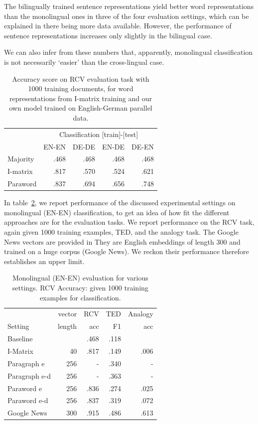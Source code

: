 The bilingually trained sentence representations yield better word representations than the monolingual ones in three of the four evaluation settings, which can be explained in there being more data available. However, the performance of sentence representations increases only slightly in the bilingual case.

We can also infer from these numbers that, apparently, monolingual classification is not necessarily `easier' than the cross-lingual case.





\begin{table}[ht]
\center
\setlength\tabcolsep{2pt}
\begin{tabular}{l | r r r r}
		& \multicolumn{4}{c}{Classification [train]-[test]}	\\
		&EN-EN	&DE-DE	&EN-DE	&DE-EN	\\\hline
Majority	&.468		&.468		&.468		&.468		\\
I-matrix	&.817		&.570		&.524		&.621		\\
Paraword  	&.837		&.694		&.656		&.748		\\
\end{tabular}
\caption{Accuracy score on RCV evaluation task with 1000 training documents, for word representations from I-matrix training and our own model trained on English-German parallel data.}
\label{t:dbow_bi_klemen}
\end{table}

In table~\ref{t:monoEval}, we report performance of the discussed experimental settings on monolingual (EN-EN) classification, to get an idea of how fit the different approaches are for the evaluation tasks. We report performance on the RCV task, again given 1000 training examples, TED, and the analogy task. The Google News vectors are provided in %
They are English embeddings of length 300 and trained on a huge corpus (Google News). We reckon their performance therefore establishes an upper limit.

\begin{table}[ht]
\center
\setlength\tabcolsep{3pt}
\begin{tabular}{l |rr r r}
 			&vector	&RCV 			&TED		&Analogy\\
Setting		&length	&acc			&F1		&acc\\\hline
Baseline		&		&.468			&.118	 	&		\\
I-Matrix		&40		&.817			&.149		&.006\\
Paragraph e		&256		&- 			&.340		&-\\
Paragraph e-d 	&256		&- 			&.363		&-\\
Paraword e		&256		&.836			&.274		&.025	\\
Paraword e-d	&256		&.837			&.319		&.072\\
Google News		&300		&.915			&.486		&.613\\
\end{tabular}
\caption{Monolingual (EN-EN) evaluation for various settings.
RCV Accuracy: given 1000 training examples for classification.}
\label{t:monoEval}
\end{table}

